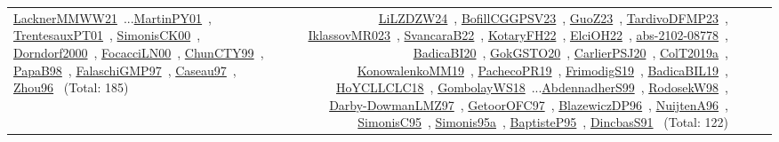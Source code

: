 {\begin{longtable}{p{3cm}r>{\raggedright\arraybackslash}p{6cm}>{\raggedright\arraybackslash}p{6cm}>{\raggedright\arraybackslash}p{8cm}}
\href{../works/LacknerMMWW21.pdf}{LacknerMMWW21}~\cite{LacknerMMWW21}...\href{../works/MartinPY01.pdf}{MartinPY01}~\cite{MartinPY01}, \href{../works/TrentesauxPT01.pdf}{TrentesauxPT01}~\cite{TrentesauxPT01}, \href{../works/SimonisCK00.pdf}{SimonisCK00}~\cite{SimonisCK00}, \href{../works/Dorndorf2000.pdf}{Dorndorf2000}~\cite{Dorndorf2000}, \href{../works/FocacciLN00.pdf}{FocacciLN00}~\cite{FocacciLN00}, \href{../works/ChunCTY99.pdf}{ChunCTY99}~\cite{ChunCTY99}, \href{../works/PapaB98.pdf}{PapaB98}~\cite{PapaB98}, \href{../works/FalaschiGMP97.pdf}{FalaschiGMP97}~\cite{FalaschiGMP97}, \href{../works/Caseau97.pdf}{Caseau97}~\cite{Caseau97}, \href{../works/Zhou96.pdf}{Zhou96}~\cite{Zhou96} (Total: 185) & \href{../works/LiLZDZW24.pdf}{LiLZDZW24}~\cite{LiLZDZW24}, \href{../works/BofillCGGPSV23.pdf}{BofillCGGPSV23}~\cite{BofillCGGPSV23}, \href{../works/GuoZ23.pdf}{GuoZ23}~\cite{GuoZ23}, \href{../works/TardivoDFMP23.pdf}{TardivoDFMP23}~\cite{TardivoDFMP23}, \href{../works/IklassovMR023.pdf}{IklassovMR023}~\cite{IklassovMR023}, \href{../works/SvancaraB22.pdf}{SvancaraB22}~\cite{SvancaraB22}, \href{../works/KotaryFH22.pdf}{KotaryFH22}~\cite{KotaryFH22}, \href{../works/ElciOH22.pdf}{ElciOH22}~\cite{ElciOH22}, \href{../works/abs-2102-08778.pdf}{abs-2102-08778}~\cite{abs-2102-08778}, \href{../works/BadicaBI20.pdf}{BadicaBI20}~\cite{BadicaBI20}, \href{../works/GokGSTO20.pdf}{GokGSTO20}~\cite{GokGSTO20}, \href{../works/CarlierPSJ20.pdf}{CarlierPSJ20}~\cite{CarlierPSJ20}, \href{../works/ColT2019a.pdf}{ColT2019a}~\cite{ColT2019a}, \href{../works/KonowalenkoMM19.pdf}{KonowalenkoMM19}~\cite{KonowalenkoMM19}, \href{../works/PachecoPR19.pdf}{PachecoPR19}~\cite{PachecoPR19}, \href{../works/FrimodigS19.pdf}{FrimodigS19}~\cite{FrimodigS19}, \href{../works/BadicaBIL19.pdf}{BadicaBIL19}~\cite{BadicaBIL19}, \href{../works/HoYCLLCLC18.pdf}{HoYCLLCLC18}~\cite{HoYCLLCLC18}, \href{../works/GombolayWS18.pdf}{GombolayWS18}~\cite{GombolayWS18}...\href{../works/AbdennadherS99.pdf}{AbdennadherS99}~\cite{AbdennadherS99}, \href{../works/RodosekW98.pdf}{RodosekW98}~\cite{RodosekW98}, \href{../works/Darby-DowmanLMZ97.pdf}{Darby-DowmanLMZ97}~\cite{Darby-DowmanLMZ97}, \href{../works/GetoorOFC97.pdf}{GetoorOFC97}~\cite{GetoorOFC97}, \href{../works/BlazewiczDP96.pdf}{BlazewiczDP96}~\cite{BlazewiczDP96}, \href{../works/NuijtenA96.pdf}{NuijtenA96}~\cite{NuijtenA96}, \href{../works/SimonisC95.pdf}{SimonisC95}~\cite{SimonisC95}, \href{../works/Simonis95a.pdf}{Simonis95a}~\cite{Simonis95a}, \href{../works/BaptisteP95.pdf}{BaptisteP95}~\cite{BaptisteP95}, \href{../works/DincbasS91.pdf}{DincbasS91}~\cite{DincbasS91} (Total: 122)\\

\end{longtable}}
